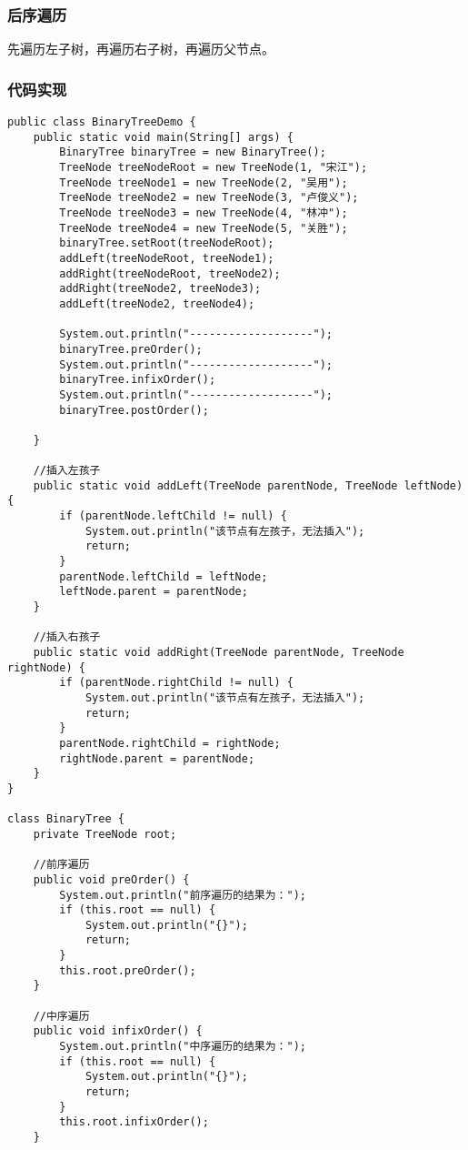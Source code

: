\documentclass[a4paper]{report}
\begin{document}
\subsubsection{后序遍历}
先遍历左子树，再遍历右子树，再遍历父节点。
\subsubsection{代码实现}
\begin{lstlisting}
public class BinaryTreeDemo {
    public static void main(String[] args) {
        BinaryTree binaryTree = new BinaryTree();
        TreeNode treeNodeRoot = new TreeNode(1, "宋江");
        TreeNode treeNode1 = new TreeNode(2, "吴用");
        TreeNode treeNode2 = new TreeNode(3, "卢俊义");
        TreeNode treeNode3 = new TreeNode(4, "林冲");
        TreeNode treeNode4 = new TreeNode(5, "关胜");
        binaryTree.setRoot(treeNodeRoot);
        addLeft(treeNodeRoot, treeNode1);
        addRight(treeNodeRoot, treeNode2);
        addRight(treeNode2, treeNode3);
        addLeft(treeNode2, treeNode4);

        System.out.println("-------------------");
        binaryTree.preOrder();
        System.out.println("-------------------");
        binaryTree.infixOrder();
        System.out.println("-------------------");
        binaryTree.postOrder();

    }

    //插入左孩子
    public static void addLeft(TreeNode parentNode, TreeNode leftNode) {
        if (parentNode.leftChild != null) {
            System.out.println("该节点有左孩子，无法插入");
            return;
        }
        parentNode.leftChild = leftNode;
        leftNode.parent = parentNode;
    }

    //插入右孩子
    public static void addRight(TreeNode parentNode, TreeNode rightNode) {
        if (parentNode.rightChild != null) {
            System.out.println("该节点有左孩子，无法插入");
            return;
        }
        parentNode.rightChild = rightNode;
        rightNode.parent = parentNode;
    }
}

class BinaryTree {
    private TreeNode root;

    //前序遍历
    public void preOrder() {
        System.out.println("前序遍历的结果为：");
        if (this.root == null) {
            System.out.println("{}");
            return;
        }
        this.root.preOrder();
    }

    //中序遍历
    public void infixOrder() {
        System.out.println("中序遍历的结果为：");
        if (this.root == null) {
            System.out.println("{}");
            return;
        }
        this.root.infixOrder();
    }


\end{lstlisting}
\end{document}
